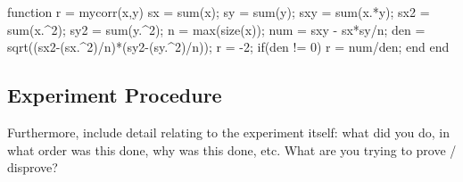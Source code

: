 \begin{Matlab}
function r = mycorr(x,y)
	sx  = sum(x);
	sy  = sum(y);
	sxy = sum(x.*y);    %
	sx2 = sum(x.^2);    %
	sy2 = sum(y.^2);
	n   = max(size(x)); %
	num = sxy - sx*sy/n;
	den = sqrt((sx2-(sx.^2)/n)*(sy2-(sy.^2)/n));
	r = -2; %
	if(den != 0)
		r = num/den;
	end
end
\end{Matlab}

  
\subsection{Experiment Procedure}
Furthermore, include detail relating to the experiment itself: what did you do, in what order was this done, why was this done, etc.  What are you trying to prove / disprove?
